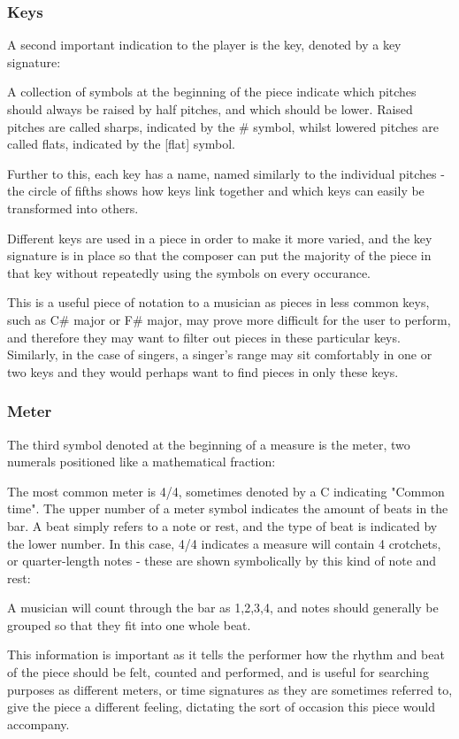 \subsubsection{Keys}
A second important indication to the player is the key, denoted by a key signature:

A collection of symbols at the beginning of the piece indicate which pitches should always be raised by half pitches, and which should be lower. Raised pitches are called sharps, indicated by the \# symbol, whilst lowered pitches are called flats, indicated by the [flat] symbol.

Further to this, each key has a name, named similarly to the individual pitches - the circle of fifths shows how keys link together and which keys can easily be transformed into others. \parencite{cofitfths}

Different keys are used in a piece in order to make it more varied, and the key signature is in place so that the composer can put the majority of the piece in that key without repeatedly using the symbols on every occurance.

This is a useful piece of notation to a musician as pieces in less common keys, such as C\# major or F\# major, may prove more difficult for the user to perform, and therefore they may want to filter out pieces in these particular keys. Similarly, in the case of singers, a singer's range may sit comfortably in one or two keys and they would perhaps want to find pieces in only these keys. 

\subsubsection{Meter}
The third symbol denoted at the beginning of a measure is the meter, two numerals positioned like a mathematical fraction:

The most common meter is 4/4, sometimes denoted by a C indicating "Common time". The upper number of a meter symbol indicates the amount of beats in the bar. A beat simply refers to a note or rest, and the type of beat is indicated by the lower number. In this case, 4/4 indicates a measure will contain 4 crotchets, or quarter-length notes - these are shown symbolically by this kind of note and rest:

A musician will count through the bar as 1,2,3,4, and notes should generally be grouped so that they fit into one whole beat.

This information is important as it tells the performer how the rhythm and beat of the piece should be felt, counted and performed, and is useful for searching purposes as different meters, or time signatures as they are sometimes referred to, give the piece a different feeling, dictating the sort of occasion this piece would accompany. 

